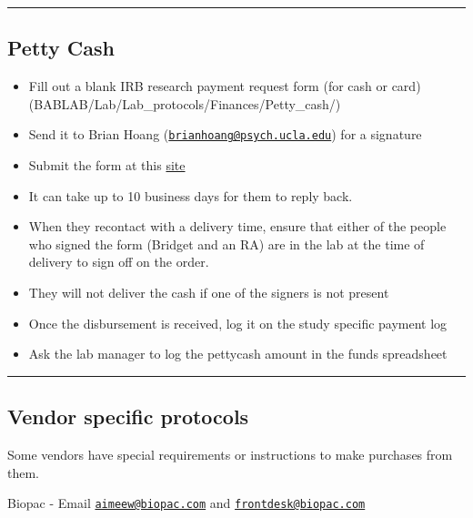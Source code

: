 \documentclass[]{book}
\providecommand{\tightlist}{%
  \setlength{\itemsep}{0pt}\setlength{\parskip}{0pt}}
\begin{document}
\begin{center}\rule{0.5\linewidth}{\linethickness}\end{center}

\hypertarget{petty-cash}{%
\subsection{Petty Cash}\label{petty-cash}}

\begin{itemize}
\tightlist
\item
  Fill out a blank IRB research payment request form (for cash or card)(BABLAB/Lab/Lab\_protocols/Finances/Petty\_cash/)
\item
  Send it to Brian Hoang (\href{mailto:brianhoang@psych.ucla.edu}{\nolinkurl{brianhoang@psych.ucla.edu}}) for a signature
\item
  Submit the form at this \href{https://sa.ucla.edu/MessageCenter/OneStop/Home/PostMessage?topicId=293}{site}
\item
  It can take up to 10 business days for them to reply back.
\item
  When they recontact with a delivery time, ensure that either of the people who signed the form (Bridget and an RA) are in the lab at the time of delivery to sign off on the order.
\item
  They will not deliver the cash if one of the signers is not present
\item
  Once the disbursement is received, log it on the study specific payment log
\item
  Ask the lab manager to log the pettycash amount in the funds spreadsheet
\end{itemize}

\begin{center}\rule{0.5\linewidth}{\linethickness}\end{center}

\hypertarget{vendor-specific-protocols}{%
\subsection{Vendor specific protocols}\label{vendor-specific-protocols}}

Some vendors have special requirements or instructions to make purchases from them.

Biopac
- Email \href{mailto:aimeew@biopac.com}{\nolinkurl{aimeew@biopac.com}} and \href{mailto:frontdesk@biopac.com}{\nolinkurl{frontdesk@biopac.com}}
\end{document}
